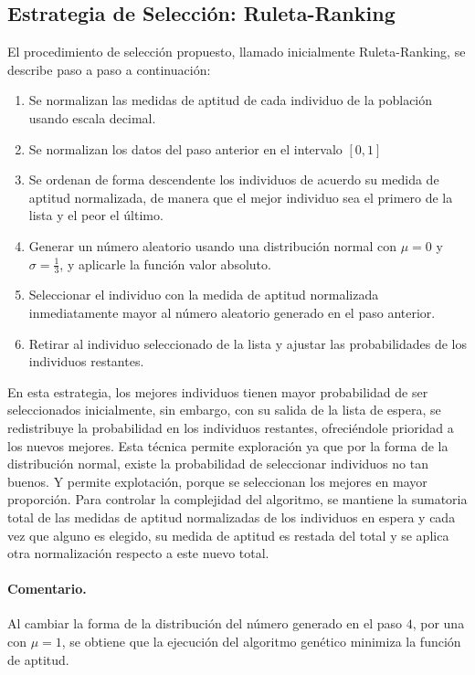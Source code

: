\documentclass{llncs}
\begin{document}
\subsection{Estrategia de Selección: Ruleta-Ranking}
El procedimiento de selección propuesto, llamado inicialmente Ruleta-Ranking, se describe paso a paso a continuación:
\begin{enumerate}
\item Se normalizan las medidas de aptitud de cada individuo de la población usando escala decimal.
\item Se normalizan los datos del paso anterior en el intervalo $[0,1]$
\item Se ordenan de forma descendente los individuos de acuerdo su medida de aptitud normalizada, de manera que el mejor individuo sea el primero de la lista y el peor el último.
\item Generar un número aleatorio usando una distribución normal con $\mu=0$ y $\sigma=\frac{1}{3}$, y aplicarle la función valor absoluto.
\item Seleccionar el individuo con la medida de aptitud normalizada inmediatamente mayor al número aleatorio generado en el paso anterior.
\item Retirar al individuo seleccionado de la lista y ajustar las probabilidades de los individuos restantes.
\end{enumerate}
En esta estrategia, los mejores individuos tienen mayor probabilidad de ser seleccionados inicialmente, sin embargo, con su salida de la lista de espera, se redistribuye la probabilidad en los individuos restantes, ofreciéndole prioridad a los nuevos mejores. Esta técnica permite exploración ya que por la forma de la distribución normal, existe la probabilidad de seleccionar individuos no tan buenos. Y permite explotación, porque se seleccionan los mejores en mayor proporción. 
Para controlar la complejidad del algoritmo, se mantiene la sumatoria total de las medidas de aptitud normalizadas de los individuos en espera y cada vez que alguno es elegido, su medida de aptitud es restada del total y se aplica otra normalización respecto a este nuevo total.

\paragraph{Comentario.}
Al cambiar la forma de la distribución del número generado en el paso $4$, por una con $\mu=1$, se obtiene que la ejecución del algoritmo genético minimiza la función de aptitud.
\end{document}
